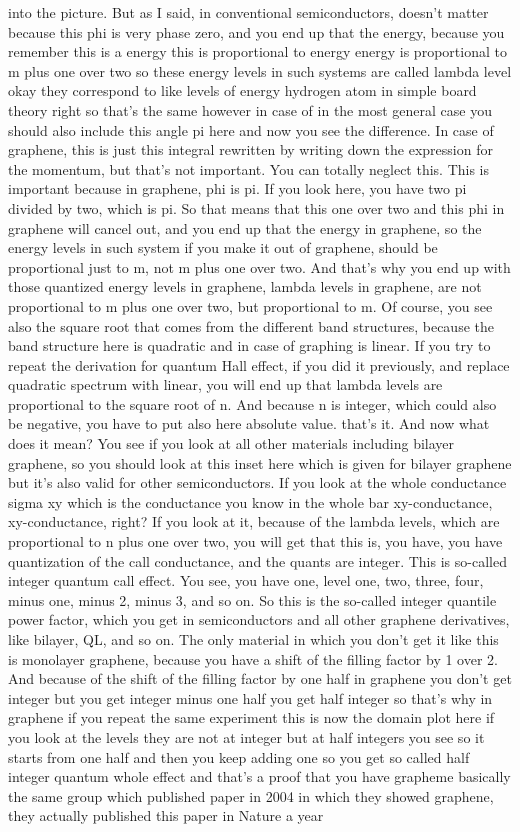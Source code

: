 into the picture. But as I said, in conventional semiconductors, doesn't matter because this phi is very phase zero, and you end up that the energy, because you remember this is a energy this is proportional to energy energy is proportional to m plus one over two so these energy levels in such systems are called lambda level okay they correspond to like levels of energy hydrogen atom in simple board theory right so that's the same however in case of in the most general case you should also include this angle pi here and now you see the difference. In case of graphene, this is just this integral rewritten by writing down the expression for the momentum, but that's not important. You can totally neglect this. This is important because in graphene, phi is pi. If you look here, you have two pi divided by two, which is pi. So that means that this one over two and this phi in graphene will cancel out, and you end up that the energy in graphene, so the energy levels in such system if you make it out of graphene, should be proportional just to m, not m plus one over two. And that's why you end up with those quantized energy levels in graphene, lambda levels in graphene, are not proportional to m plus one over two, but proportional to m. Of course, you see also the square root that comes from the different band structures, because the band structure here is quadratic and in case of graphing is linear. If you try to repeat the derivation for quantum Hall effect, if you did it previously, and replace quadratic spectrum with linear, you will end up that lambda levels are proportional to the square root of n. And because n is integer, which could also be negative, you have to put also here absolute value. that's it. And now what does it mean? You see if you look at all other materials including bilayer graphene, so you should look at this inset here which is given for bilayer graphene but it's also valid for other semiconductors. If you look at the whole conductance sigma xy which is the conductance you know in the whole bar xy-conductance, xy-conductance, right? If you look at it, because of the lambda levels, which are proportional to n plus one over two, you will get that this is, you have, you have quantization of the call conductance, and the quants are integer. This is so-called integer quantum call effect. You see, you have one, level one, two, three, four, minus one, minus 2, minus 3, and so on. So this is the so-called integer quantile power factor, which you get in semiconductors and all other graphene derivatives, like bilayer, QL, and so on. The only material in which you don't get it like this is monolayer graphene, because you have a shift of the filling factor by 1 over 2. And because of the shift of the filling factor by one half in graphene you don't get integer but you get integer minus one half you get half integer so that's why in graphene if you repeat the same experiment this is now the domain plot here if you look at the levels they are not at integer but at half integers you see so it starts from one half and then you keep adding one so you get so called half integer quantum whole effect and that's a proof that you have grapheme basically the same group which published paper in 2004 in which they showed graphene, they actually published this paper in Nature a year 